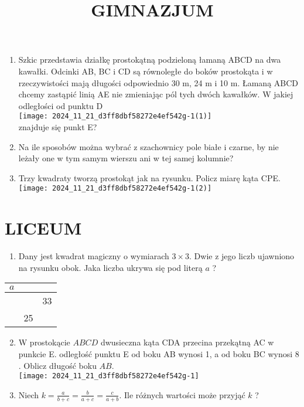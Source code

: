 \documentclass[10pt]{article}
\title{GIMNAZJUM }
\author{}
\date{}
\begin{document}
\maketitle
\begin{enumerate}
  \item Szkic przedstawia działkę prostokątną podzieloną łamaną ABCD na dwa kawałki. Odcinki AB, BC i CD są równoległe do boków prostokąta i w rzeczywistości mają długości odpowiednio 30 m, 24 m i 10 m. Łamaną ABCD chcemy zastąpić linią AE nie zmieniając pól tych dwóch kawałków. W jakiej odległości od punktu D\\
\texttt{[image: 2024\_11\_21\_d3ff8dbf58272e4ef542g-1(1)]}\\
znajduje się punkt E?
  \item Na ile sposobów można wybrać z szachownicy pole białe i czarne, by nie leżały one w tym samym wierszu ani w tej samej kolumnie?
  \item Trzy kwadraty tworzą prostokąt jak na rysunku. Policz miarę kąta CPE.\\
\texttt{[image: 2024\_11\_21\_d3ff8dbf58272e4ef542g-1(2)]}
\end{enumerate}

\section*{LICEUM}
\begin{enumerate}
  \item Dany jest kwadrat magiczny o wymiarach \(3 \times 3\). Dwie z jego liczb ujawniono na rysunku obok. Jaka liczba ukrywa się pod literą \(a\) ?
\end{enumerate}

\begin{center}
\begin{tabular}{|l|l|l|}
\hline
\(a\) &  &  \\
\hline
 &  & 33 \\
\hline
 & 25 &  \\
\hline
\end{tabular}
\end{center}

\begin{enumerate}
  \setcounter{enumi}{1}
  \item W prostokącie \(A B C D\) dwusieczna kąta CDA przecina przekątną AC w punkcie E. odległość punktu E od boku AB wynosi 1, a od boku BC wynosi 8 . Oblicz długość boku \(A B\).\\
\texttt{[image: 2024\_11\_21\_d3ff8dbf58272e4ef542g-1]}
  \item Niech \(k=\frac{a}{b+c}=\frac{b}{a+c}=\frac{c}{a+b}\). Ile różnych wartości może przyjąć \(k\) ?
\end{enumerate}
\end{document}
